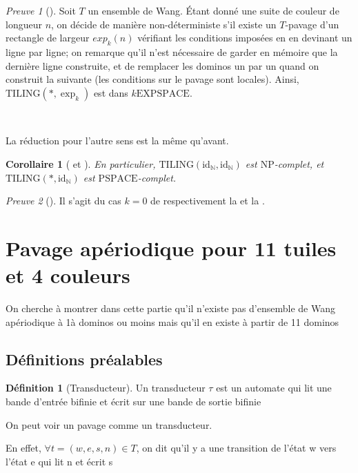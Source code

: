 \documentclass{scrartcl}
\newcommand{\N}{\mathbb N}
\newcommand{\id}{\mathrm{id}}
\newtheorem{corollaire}{Corollaire}
\theoremstyle{definition}
\newtheorem{definition}{Définition}
\theoremstyle{remark}
\newtheorem{preuve}{Preuve}
\begin{document}
\begin{preuve}[]
  Soit $T$ un ensemble de Wang. Étant donné une suite de couleur de longueur $n$, on décide de manière non-déterministe s'il existe un $T$-pavage d'un rectangle de largeur $exp_k(n)$ vérifiant les conditions imposées en en devinant un ligne par ligne; on remarque qu'il n'est nécessaire de garder en mémoire que la dernière ligne construite, et de remplacer les dominos un par un quand on construit la suivante (les conditions sur le pavage sont locales). Ainsi, $\mathrm{TILING}(*,\exp_k)$ est dans $k\mathrm{EXPSPACE}$.

  \

  La réduction pour l'autre sens est la même qu'avant.
\end{preuve}

\begin{corollaire}[ et ]
  En particulier, $\mathrm{TILING}(\id_\N,\id_\N)$ est $\mathrm{NP}$-complet, et $\mathrm{TILING}(*,\id_\N)$ est $\mathrm{PSPACE}$-complet. 
\end{corollaire}

\begin{preuve}[]
  Il s'agit du cas $k=0$ de respectivement la  et la .
\end{preuve}

\section{Pavage apériodique pour 11 tuiles et 4 couleurs}

On cherche à montrer dans cette partie qu'il n'existe pas d'ensemble de Wang apériodique à 1à dominos ou moins
mais qu'il en existe à partir de 11 dominos

\subsection{Définitions préalables}

\begin{definition}[Transducteur]
    
Un transducteur $\tau$ est un automate qui lit une bande d'entrée bifinie et écrit sur une bande de sortie bifinie

\end{definition}

On peut voir un pavage comme un transducteur.

En effet, $\forall t = (w,e,s,n) \in T$, on dit qu'il y a une transition de l'état w vers l'état e qui lit n et écrit s
\end{document}
